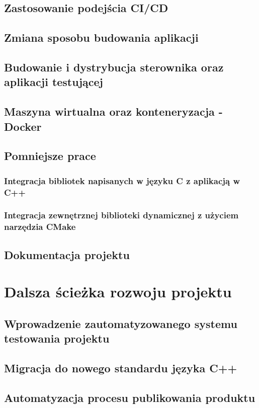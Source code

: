 \section{Zastosowanie podejścia CI/CD}
\section{Zmiana sposobu budowania aplikacji}
\section{Budowanie i dystrybucja sterownika oraz aplikacji testującej}
\section{Maszyna wirtualna oraz konteneryzacja - Docker}
\section{Pomniejsze prace}
\subsection{Integracja bibliotek napisanych w języku C z aplikacją w C++}
\subsection{Integracja zewnętrznej biblioteki dynamicznej z użyciem narzędzia CMake}
\section{Dokumentacja projektu}

\chapter{Dalsza ścieżka rozwoju projektu}
\label{cha:dalsze}

\section{Wprowadzenie zautomatyzowanego systemu testowania projektu}
\section{Migracja do nowego standardu języka C++}
\section{Automatyzacja procesu publikowania produktu}

